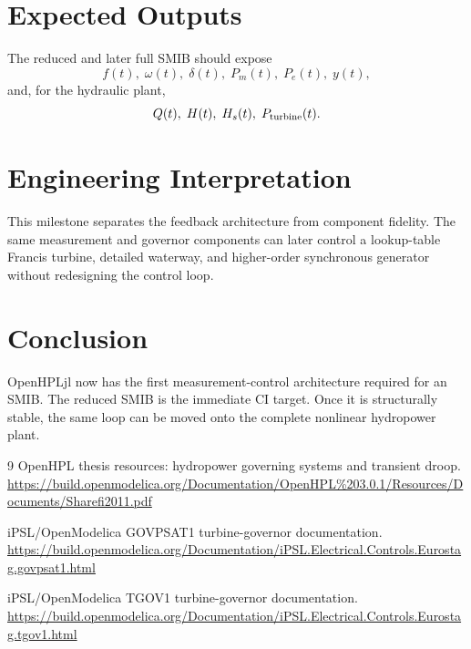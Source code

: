 \documentclass[10pt,a4paper]{article}
\begin{document}
\section{Expected Outputs}
The reduced and later full SMIB should expose
\[
f(t),\;\omega(t),\;\delta(t),\;P_m(t),\;P_e(t),\;y(t),
\]
and, for the hydraulic plant,
\[
Q(t),\;H(t),\;H_s(t),\;P_{\rm turbine}(t).
\]

\section{Engineering Interpretation}
This milestone separates the feedback architecture from component fidelity. The same measurement and governor components can later control a lookup-table Francis turbine, detailed waterway, and higher-order synchronous generator without redesigning the control loop.

\section*{Conclusion}
OpenHPLjl now has the first measurement-control architecture required for an SMIB. The reduced SMIB is the immediate CI target. Once it is structurally stable, the same loop can be moved onto the complete nonlinear hydropower plant.

\begin{thebibliography}{9}
OpenHPL thesis resources: hydropower governing systems and transient droop.
\url{https://build.openmodelica.org/Documentation/OpenHPL%203.0.1/Resources/Documents/Sharefi2011.pdf}

iPSL/OpenModelica GOVPSAT1 turbine-governor documentation.
\url{https://build.openmodelica.org/Documentation/iPSL.Electrical.Controls.Eurostag.govpsat1.html}

iPSL/OpenModelica TGOV1 turbine-governor documentation.
\url{https://build.openmodelica.org/Documentation/iPSL.Electrical.Controls.Eurostag.tgov1.html}
\end{thebibliography}
\end{document}

